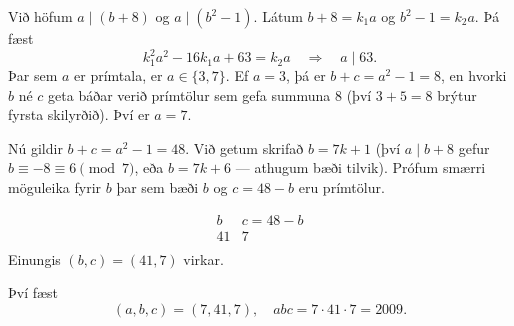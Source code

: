 Við höfum $a \mid (b+8)$ og $a \mid (b^{2}-1)$.
Látum $b + 8 = k_{1}a$ og $b^{2} - 1 = k_{2}a$.
Þá fæst
\[
k_{1}^{2}a^{2} - 16k_{1}a + 63 = k_{2}a \quad \Longrightarrow \quad a \mid 63.
\]
Þar sem $a$ er prímtala, er $a\in\{3,7\}$.
Ef $a=3$, þá er $b+c=a^{2}-1=8$, en hvorki $b$ né $c$ geta báðar verið prímtölur sem gefa summuna $8$ (því $3+5=8$ brýtur fyrsta skilyrðið).  
Því er $a=7$.

Nú gildir $b+c=a^{2}-1=48$.
Við getum skrifað $b=7k+1$ (því $a\mid b+8$ gefur $b\equiv -8\equiv 6\pmod{7}$, eða $b=7k+6$ — athugum bæði tilvik).
Prófum smærri möguleika fyrir $b$ þar sem bæði $b$ og $c=48-b$ eru prímtölur.

\[
\begin{array}{c|c}
b & c=48-b \\ \hline
41 & 7 \\
\end{array}
\]
Einungis $(b,c)=(41,7)$ virkar.

Því fæst
\[
(a,b,c)=(7,41,7), \quad abc = 7\cdot41\cdot7 = \boxed{2009}.
\]